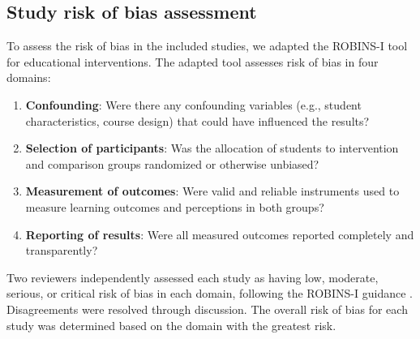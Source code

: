 \documentclass[
	hf,
	]{ceurart}
\begin{document}
		
		\subsection{Study risk of bias assessment}
		
		To assess the risk of bias in the included studies, we adapted the ROBINS-I tool \citep{SterneEtAl2016} for educational interventions. The adapted tool assesses risk of bias in four domains:
		
		\begin{enumerate}
			\item \textbf{Confounding}: Were there any confounding variables (e.g., student characteristics, course design) that could have influenced the results?
			\item \textbf{Selection of participants}: Was the allocation of students to intervention and comparison groups randomized or otherwise unbiased?  
			\item \textbf{Measurement of outcomes}: Were valid and reliable instruments used to measure learning outcomes and perceptions in both groups?
			\item \textbf{Reporting of results}: Were all measured outcomes reported completely and transparently?
		\end{enumerate}
		
		Two reviewers independently assessed each study as having low, moderate, serious, or critical risk of bias in each domain, following the ROBINS-I guidance \citep{SterneEtAl2016}. Disagreements were resolved through discussion. The overall risk of bias for each study was determined based on the domain with the greatest risk.
		
\end{document}
